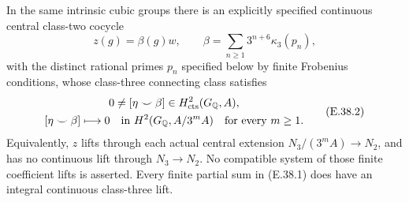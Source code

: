 \begin{proposition}
\label{E-zero-slice-inverse-limit}
In the same intrinsic cubic groups there
is an explicitly specified continuous
central class-two cocycle
\[
       z(g)=\beta(g)w,
 \qquad
       \beta=\sum_{n\ge1}3^{n+6}\kappa_3(p_n),
 \tag{E.38.1}
\]
with the distinct rational primes $p_n$
specified below by finite Frobenius
conditions, whose class-three connecting
class satisfies
\[
 \begin{gathered}
 0\ne[\eta\smile\beta]
             \in H^2_{\rm cts}(G_{\mathbb Q},A),\\
 [\eta\smile\beta]\longmapsto0
             \quad\text{in }H^2(G_{\mathbb Q},A/3^mA)
                    \quad\text{for every }m\ge1.
 \end{gathered}
 \tag{E.38.2}
\]
Equivalently, $z$ lifts through each
actual central extension
$N_3/(3^mA)\to N_2$, and has no
continuous lift through $N_3\to N_2$.
No compatible system of those finite
coefficient lifts is asserted. Every
finite partial sum in (E.38.1) does
have an integral continuous class-three
lift.
\end{proposition}

